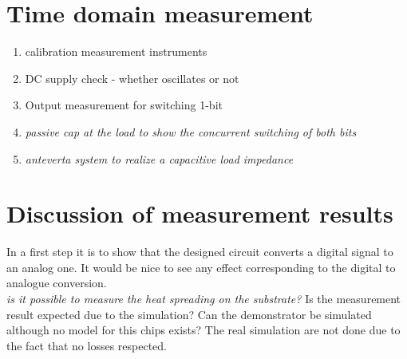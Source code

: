 \section{Time domain measurement}
\begin{enumerate}
	\item calibration measurement instruments
	\item DC supply check - whether oscillates or not
	\item Output measurement for switching 1-bit
	\item \textit{passive cap at the load to show the concurrent switching of both bits}
	\item \textit{anteverta system to realize a capacitive load impedance}
\end{enumerate}
\section{Discussion of measurement results}
In a first step it is to show that the designed circuit converts a digital signal to an analog one. It would be nice to see any effect corresponding to the digital to analogue conversion. \\
\textit{is it possible to measure the heat spreading on the substrate?}
Is the measurement result expected due to the simulation? Can the demonstrator be simulated although no model for this chips exists? The real simulation are not done due to the fact that no losses respected.

